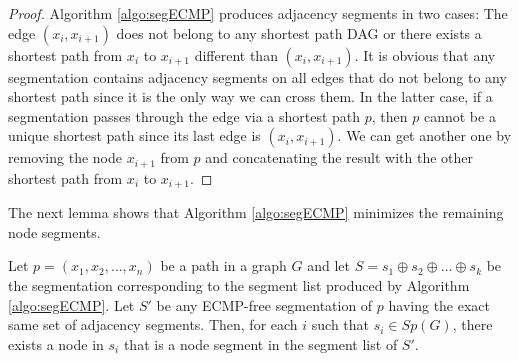 \begin{proof}
Algorithm \ref{algo:segECMP} produces adjacency segments in two cases: The edge $(x_i, x_{i + 1})$ does not belong to any
shortest path DAG or there exists a shortest path from $x_i$ to $x_{i + 1}$ different than $(x_i, x_{i + 1})$.
It is obvious that any segmentation contains adjacency segments on all edges
that do not belong to any shortest path since it is the only way we can cross them. In the latter case,
if a segmentation passes through the edge via a shortest path $p$, then $p$ cannot be a unique shortest path since
its last edge is $(x_i, x_{i + 1})$. We can get another one by removing the node $x_{i + 1}$ from $p$
and concatenating the result with the other shortest path from $x_i$ to $x_{i + 1}$.
% 
\end{proof}

The next lemma shows that Algorithm \ref{algo:segECMP} minimizes the remaining node segments.

\begin{lemma}
\label{lemma:min_seg_ecmp}
Let $p = (x_1, x_2, \ldots, x_n)$ be a path in a graph $G$ and let $S = s_1 \oplus s_2 \oplus \ldots \oplus s_k$ be the segmentation corresponding to the
segment list produced by Algorithm \ref{algo:segECMP}. 
Let $S'$ be any ECMP-free segmentation of $p$ having the exact same set of adjacency segments. Then, for each $i$ such that $s_i \in \textit{Sp}(G)$,
there exists a node in $s_i$ that is a node segment in the segment list of $S'$.
\end{lemma}

